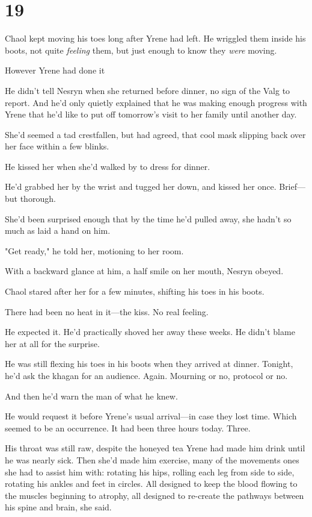 
\chapter{19}

Chaol kept moving his toes long after Yrene had left. He wriggled them inside his boots, not quite \emph{feeling} them, but just enough to know they \emph{were} moving.

However Yrene had done it 

He didn't tell Nesryn when she returned before dinner, no sign of the Valg to report. And he'd only quietly explained that he was making enough progress with Yrene that he'd like to put off tomorrow's visit to her family until another day.

She'd seemed a tad crestfallen, but had agreed, that cool mask slipping back over her face within a few blinks.

He kissed her when she'd walked by to dress for dinner.

He'd grabbed her by the wrist and tugged her down, and kissed her once. Brief---but thorough.

She'd been surprised enough that by the time he'd pulled away, she hadn't so much as laid a hand on him.

"Get ready," he told her, motioning to her room.

With a backward glance at him, a half smile on her mouth, Nesryn obeyed.

Chaol stared after her for a few minutes, shifting his toes in his boots.

There had been no heat in it---the kiss. No real feeling.

He expected it. He'd practically shoved her away these weeks. He didn't blame her at all for the surprise.

He was still flexing his toes in his boots when they arrived at dinner. Tonight, he'd ask the khagan for an audience. Again. Mourning or no, protocol or no.

And then he'd warn the man of what he knew.

He would request it before Yrene's usual arrival---in case they lost time. Which seemed to be an occurrence. It had been three hours today. Three.

His throat was still raw, despite the honeyed tea Yrene had made him drink until he was nearly sick. Then she'd made him exercise, many of the movements ones she had to assist him with: rotating his hips, rolling each leg from side to side, rotating his ankles and feet in circles. All designed to keep the blood flowing to the muscles beginning to atrophy, all designed to re-create the pathways between his spine and brain, she said.

